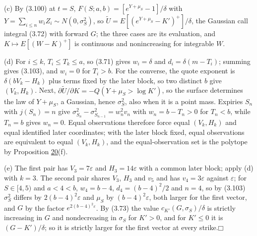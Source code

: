 \documentclass[11pt]{article}
\providecommand{\square}{\mdlgwhtsquare}
\begin{document}
(c) By (3.100) at \(t = S\), \(F(S; a, b) = [e^{Y + \mu_S} - 1] / \delta\) with \(Y = \sum_{i \le n} w_i Z_i \sim N(0, \sigma_S^2)\), so \(\tilde U = E[(e^{Y + \mu_S} - K')^+] / \delta\), the Gaussian call integral (3.72) with forward \(G\); the three cases are its evaluation, and \(K \mapsto E[(W - K)^+]\) is continuous and nonincreasing for integrable \(W\).

(d) For \(i \le k\), \(T_i \le T_k \le a\), so (3.71) gives \(w_i = \delta\) and \(d_i = \delta(m - T_i)\); summing gives (3.103), and \(w_i = 0\) for \(T_i > b\). For the converse, the quote exponent is \(\delta(b V_k - H_k)\) plus terms fixed by the later block, so two distinct \(b\) give \((V_k, H_k)\). Next, \(\partial \tilde U / \partial K = -Q(Y + \mu_S > \log K')\), so the surface determines the law of \(Y + \mu_S\), a Gaussian, hence \(\sigma_S^2\), also when it is a point mass. Expiries \(S_n\) with \(j(S_n) = n\) give \(\sigma_{S_n}^2 - \sigma_{S_{n-1}}^2 = w_n^2 v_n\) with \(w_n = b - T_n > 0\) for \(T_n < b\), while \(T_n = b\) gives \(w_n = 0\). Equal observations therefore force equal \((V_k, H_k)\) and equal identified later coordinates; with the later block fixed, equal observations are equivalent to equal \((V_k, H_k)\), and the equal-observation set is the polytope by Proposition \hyperref[res:Proposition-20]{20}(f).

(e) The first pair has \(V_3 = 7\varepsilon\) and \(H_3 = 14\varepsilon\) with a common later block; apply (d) with \(k = 3\). The second pair shares \(V_3\), \(H_3\) and \(v_5\) and has \(v_4 = 3\varepsilon\) against \(\varepsilon\); for \(S \in [4, 5)\) and \(a < 4 < b\), \(w_4 = b - 4\), \(d_4 = (b - 4)^2 / 2\) and \(n = 4\), so by (3.103) \(\sigma_S^2\) differs by \(2(b - 4)^2 \varepsilon\) and \(\mu_S\) by \((b - 4)^2 \varepsilon\), both larger for the first vector, and \(G\) by the factor \(e^{2(b - 4)^2 \varepsilon}\). By (3.73) the value \(c_{K'}(G, \sigma_S) / \delta\) is strictly increasing in \(G\) and nondecreasing in \(\sigma_S\) for \(K' > 0\), and for \(K' \le 0\) it is \((G - K') / \delta\); so it is strictly larger for the first vector at every strike.\hfill$\square$
\end{document}
